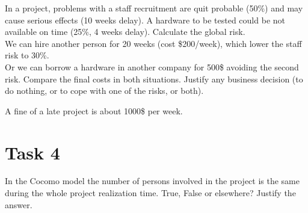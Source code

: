 \documentclass[12pt]{article}
\begin{document}
In a project, problems with a staff recruitment are quit probable (50\%) and may cause serious effects (10 weeks delay). A hardware to be tested could be not available on time (25\%, 4 weeks delay). Calculate the global risk.  \\ 

We can hire another person for 20 weeks (cost \$200/week), which lower the staff risk to 30\%.  \\   
Or we can borrow a hardware in another company for 500\$ avoiding the second risk. 
Compare the final costs in both situations. Justify any business decision (to do nothing, or to cope with one of the risks, or both). 

A fine of a late project is about 1000\$ per week.  


\section{Task 4}
In the Cocomo model the number of persons involved in the project is the same during the whole project realization time. True, False or elsewhere? Justify the answer. 
\end{document}
